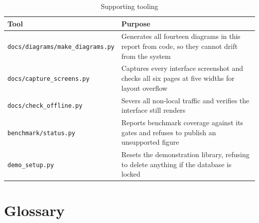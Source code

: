 \documentclass[
12pt,
a4paper,
oneside
]{report}
\begin{document}
\begin{table}[H]
\centering
\begin{tabular}{|p{5.4cm}|p{7.4cm}|}
\hline
\textbf{Tool} & \textbf{Purpose} \\
\hline
\texttt{docs/diagrams/make\_diagrams.py} & Generates all fourteen diagrams in
this report from code, so they cannot drift from the system \\
\hline
\texttt{docs/capture\_screens.py} & Captures every interface screenshot and
checks all six pages at five widths for layout overflow \\
\hline
\texttt{docs/check\_offline.py} & Severs all non-local traffic and verifies the
interface still renders \\
\hline
\texttt{benchmark/status.py} & Reports benchmark coverage against its gates and
refuses to publish an unsupported figure \\
\hline
\texttt{demo\_setup.py} & Resets the demonstration library, refusing to delete
anything if the database is locked \\
\hline
\end{tabular}
\caption{Supporting tooling}
\end{table}


\chapter*{Glossary}
\end{document}
